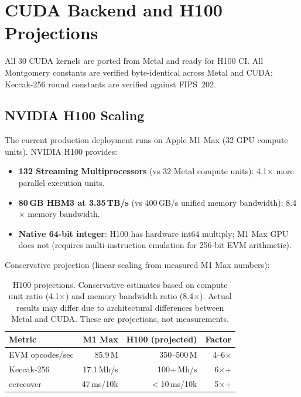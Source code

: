 \documentclass[11pt]{article}
\begin{document}
\section{CUDA Backend and H100 Projections}
\label{sec:future}

All 30 CUDA kernels are ported from Metal and ready for H100 CI. All Montgomery constants
are verified byte-identical across Metal and CUDA; Keccak-256 round constants are verified
against FIPS~202.

\subsection{NVIDIA H100 Scaling}

The current production deployment runs on Apple M1 Max (32 GPU compute units).
NVIDIA H100 provides:

\begin{itemize}
\item \textbf{132 Streaming Multiprocessors} (vs 32 Metal compute units): 4.1$\times$ more
      parallel execution units.
\item \textbf{80\,GB HBM3 at 3.35\,TB/s} (vs 400\,GB/s unified memory bandwidth):
      8.4$\times$ memory bandwidth.
\item \textbf{Native 64-bit integer}: H100 has hardware int64 multiply; M1 Max GPU does not
      (requires multi-instruction emulation for 256-bit EVM arithmetic).
\end{itemize}

Conservative projection (linear scaling from measured M1 Max numbers):

\begin{table}[h]
\centering
\small
\begin{tabular}{lrrr}
\toprule
\textbf{Metric} & \textbf{M1 Max} & \textbf{H100 (projected)} & \textbf{Factor} \\
\midrule
EVM opcodes/sec & 85.9\,M   & 350--500\,M  & 4--6$\times$ \\
Keccak-256      & 17.1\,Mh/s & 100+\,Mh/s  & 6$\times$+ \\
ecrecover       & 47\,ms/10k & $<$10\,ms/10k & 5$\times$+ \\
\bottomrule
\end{tabular}
\caption{H100 projections. Conservative estimates based on compute unit ratio (4.1$\times$)
and memory bandwidth ratio (8.4$\times$). Actual results may differ due to architectural
differences between Metal and CUDA. These are projections, not measurements.}
\label{tab:h100}
\end{table}
\end{document}
